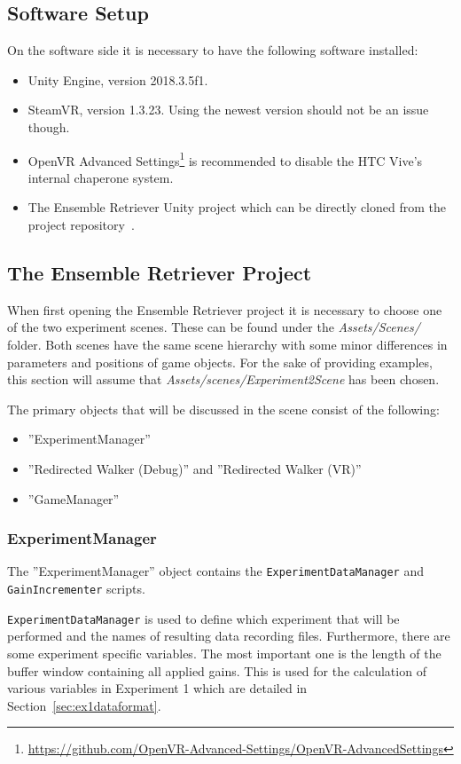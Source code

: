 \subsection{Software Setup}
On the software side it is necessary to have the following software installed:
\begin{itemize}
    \item Unity Engine, version 2018.3.5f1.
    \item SteamVR, version 1.3.23. Using the newest version should not be an issue though. 
    \item OpenVR Advanced Settings\footnote{\url{https://github.com/OpenVR-Advanced-Settings/OpenVR-AdvancedSettings}} is recommended to disable the HTC Vive's internal chaperone system.
    \item The Ensemble Retriever Unity project which can be directly cloned from the project repository~\cite{projectRepository}.
\end{itemize}

\subsection{The Ensemble Retriever Project}\label{sec:ensembleRetrieverReproInfo}
When first opening the Ensemble Retriever project it is necessary to choose one of the two experiment scenes. These can be found under the \emph{Assets/Scenes/} folder. Both scenes have the same scene hierarchy with some minor differences in parameters and positions of game objects. For the sake of providing examples, this section will assume that \emph{Assets/scenes/Experiment2Scene} has been chosen. 

The primary objects that will be discussed in the scene consist of the following:
\begin{itemize}
    \item ''ExperimentManager''
    \item ''Redirected Walker (Debug)'' and ''Redirected Walker (VR)''
    \item ''GameManager''
\end{itemize}

\subsubsection{ExperimentManager}
The ''ExperimentManager'' object contains the \lstinline{ExperimentDataManager} and \lstinline{GainIncrementer} scripts. 

\lstinline{ExperimentDataManager} is used to define which experiment that will be performed and the names of resulting data recording files. Furthermore, there are some experiment specific variables. The most important one is the length of the buffer window containing all applied gains. This is used for the calculation of various variables in Experiment 1 which are detailed in Section~\ref{sec:ex1dataformat}.


